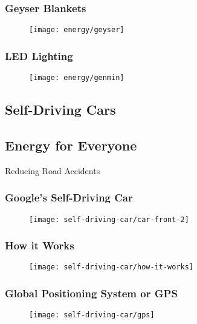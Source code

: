 \documentclass{beamer}
\begin{document}
\begin{frame}
  \frametitle{Geyser Blankets}
  \begin{figure}
  \centering
  \texttt{[image: energy/geyser]}
  \end{figure}
\end{frame}

\begin{frame}
  \frametitle{LED Lighting}
  \begin{figure}
  \centering
  \texttt{[image: energy/genmin]}
  \end{figure}
\end{frame}

\subsection{Self-Driving Cars}
\subsection{Energy for Everyone}
\begin{frame}[plain,c]
\begin{center}
\Huge Reducing Road Accidents
\end{center}
\end{frame}


\begin{frame}
  \frametitle{Google's Self-Driving Car}
  \begin{figure}
  \centering
  \texttt{[image: self-driving-car/car-front-2]}
  \end{figure}
\end{frame}

% 

\begin{frame}
  \frametitle{How it Works}
  \begin{figure}
  \centering
  \texttt{[image: self-driving-car/how-it-works]}
  \end{figure}
\end{frame}

\begin{frame}
  \frametitle{Global Positioning System or GPS}
  \begin{figure}
  \centering
  \texttt{[image: self-driving-car/gps]}
  \end{figure}
\end{frame}
\end{document}
